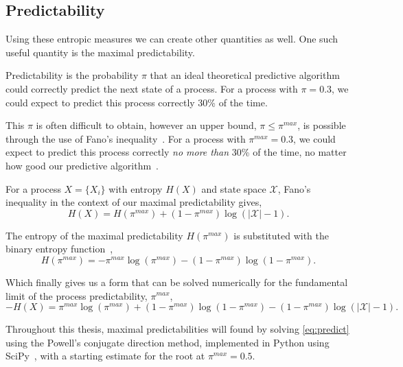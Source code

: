 \subsection{Predictability}

Using these entropic measures we can create other quantities as well. One such useful quantity is the maximal predictability.

Predictability is the probability $\pi$ that an ideal theoretical predictive algorithm could correctly predict the next state of a process. For a process with $\pi = 0.3$, we could expect to predict this process correctly 30\% of the time. 

This $\pi$ is often difficult to obtain, however an upper bound, $\pi \leq \pi^{max}$, is possible through the use of Fano's inequality~\cite{fano_transmission_1961}.  For a process with $\pi^{max} = 0.3$, we could expect to predict this process correctly \emph{no more than} 30\% of the time, no matter how good our predictive algorithm~\cite{song_limits_2010}.


\begin{definition}\label{def:maximialpredictability}
For a process $X = \{ X_i \}$ with entropy $H(X)$ and state space $\mathcal{X}$, Fano's inequality in the context of our maximal predictability gives,
\begin{equation}
H(X) = H(\pi^{max}) + (1 - \pi^{max}) \log (|\mathcal{X}| - 1).
\end{equation}
\end{definition}

The entropy of the maximal predictability $H(\pi^{max})$ is substituted with the binary entropy function~\cite{song_limits_2010},   
\begin{equation}
H(\pi^{max}) = -\pi^{max} \log(\pi^{max}) - (1 -  \pi^{max}) \log(1 - \pi^{max}).
\end{equation}

Which finally gives us a form that can be solved numerically for the fundamental limit of the process predictability, $\pi^{max}$,
\begin{equation}\label{eq:predict}
-H(X)  = \pi^{max} \log(\pi^{max}) + (1 -  \pi^{max}) \log(1 - \pi^{max}) - (1 - \pi^{max}) \log (|\mathcal{X}| - 1).
\end{equation}


Throughout this thesis, maximal predictabilities will found by solving \autoref{eq:predict} using the Powell's conjugate direction method, implemented in Python using SciPy~\cite{virtanen_scipy_2019}, with a starting estimate for the root at $\pi^{max}=0.5$.

